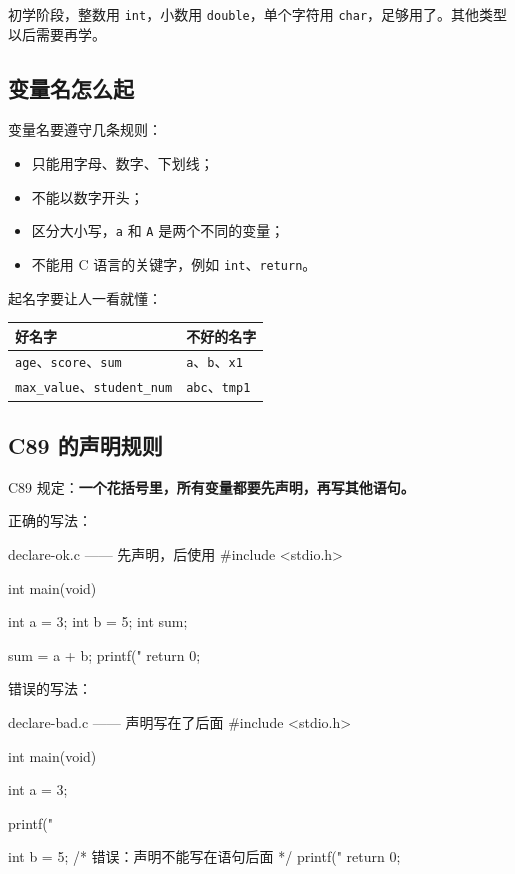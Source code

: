 \begin{tipbox}[先只用这三种]
初学阶段，整数用 \texttt{int}，小数用 \texttt{double}，单个字符用 \texttt{char}，足够用了。其他类型以后需要再学。
\end{tipbox}

\subsection{变量名怎么起}

变量名要遵守几条规则：

\begin{itemize}
  \item 只能用字母、数字、下划线；
  \item 不能以数字开头；
  \item 区分大小写，\texttt{a} 和 \texttt{A} 是两个不同的变量；
  \item 不能用 C 语言的关键字，例如 \texttt{int}、\texttt{return}。
\end{itemize}

起名字要让人一看就懂：

\begin{center}
\begin{tabular}{@{}ll@{}}
\toprule
好名字 & 不好的名字 \\
\midrule
\texttt{age}、\texttt{score}、\texttt{sum} & \texttt{a}、\texttt{b}、\texttt{x1} \\
\texttt{max\_value}、\texttt{student\_num} & \texttt{abc}、\texttt{tmp1} \\
\bottomrule
\end{tabular}
\end{center}

\subsection{C89 的声明规则}

C89 规定：\textbf{一个花括号里，所有变量都要先声明，再写其他语句。}

正确的写法：

\begin{codebox}{declare-ok.c —— 先声明，后使用}
#include <stdio.h>

int main(void)
{
    int a = 3;
    int b = 5;
    int sum;

    sum = a + b;
    printf("%
    return 0;
}
\end{codebox}

错误的写法：

\begin{codebox}{declare-bad.c —— 声明写在了后面}
#include <stdio.h>

int main(void)
{
    int a = 3;

    printf("%

    int b = 5;      /* 错误：声明不能写在语句后面 */
    printf("%
    return 0;
}
\end{codebox}


